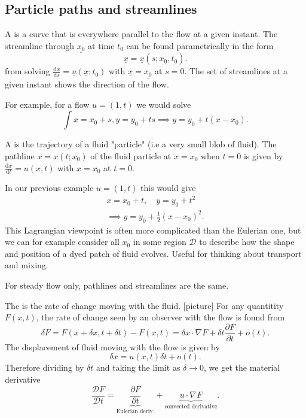 \documentclass[egregdoesnotlikesansseriftitles,a4paper]{scrartcl}
\renewcommand{\vec}[1]{\underline{#1}}
\begin{document}
\subsection{Particle paths and streamlines}
\begin{definition*}[Streamline]
     A  is a curve that is everywhere parallel to the flow at a given instant. The streamline through $\vec{x_0 } $ at time $t_0 $ can be found parametrically in the form \[
     \vec{x} =\vec{x} (s; \vec{x_0 } , \vec{t_0 } )
     .\] from solving $\frac{\mathrm{d}x}{\mathrm{d}s}=\vec{u} (\vec{x};t_0 )$ with $\vec{x} =\vec{x_0 } $ at $s=0$. The set of streamlines at a given instant shows the direction of the flow.
\end{definition*}
For example, for a flow $u= (1,t)$ we would solve \[
\int x = x_0 +s, y=y_0 +ts \implies y=y_0 +t (x-x_0 )
.\] 
\begin{definition*}
     A  is the trajectory of a fluid "particle" (i.e a very small blob of fluid). The pathline $x=x (t;x_0 )$ of the fluid particle at $x=x_0 $ when $t=0$ is given by $\frac{\mathrm{d}x}{\mathrm{d}t}=u (x,t)$ with $x=x_0 $ at $t=0$.
\end{definition*}
In our previous example $u= (1,t)$ this would give 
\begin{align*}
    x=x_0 +t, \quad y=y_0 +t^2 \\
    \implies y=y_0 + \frac{1}{2} (x-x_0)^2.
\end{align*}
This Lagrangian viewpoint is often more complicated than the Eulerian one, but we can for example consider all $x_0 $ in some region $\mathcal{D}$ to describe how the shape and position of a dyed patch of fluid evolves. Useful for thinking about transport and mixing.
\begin{remark}
     For steady flow only, pathlines and streamlines are the same. 
\end{remark}
\begin{definition*}
     The  is the rate of change moving with the fluid. [picture] For any quantitity $F (x,t)$, the rate of change seen by an observer with the flow is found from \[
     \delta F =F (x+\delta x, t+\delta t)-F (x,t)=\delta x \cdot \nabla F +\delta t \frac{\partial F}{\partial t}+o (t)
     .\] 
     The displacement of fluid moving with the flow is given by \[
     \delta x= u (x,t) \delta t + o (t)
     .\] Therefore dividing by $\delta t$ and taking the limit as $\delta \rightarrow 0$, we get the material derivative \[
     \frac{\mathcal{D}F}{\mathcal{D}t}=\underbrace{\frac{\partial F}{\partial t}}_{\text{Eulerian deriv.} } + \underbrace{u \cdot \nabla F}_{\text{convected derivative} } 
     .\] 
\end{definition*}
\end{document}
